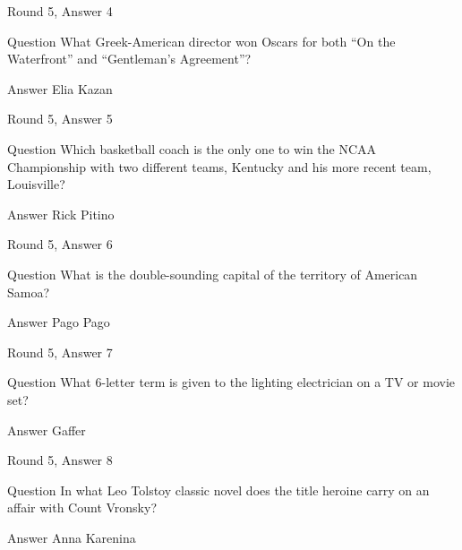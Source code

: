 \documentclass[11pt]{beamer}
\begin{document}
\begin{frame}[t]{Round 5, Answer 4}
\vspace{2em}
\begin{block}{Question}
What Greek-American director won Oscars for both ``On the Waterfront'' and ``Gentleman's Agreement''\@?
\end{block}
\pause{}
\begin{block}{Answer}
Elia Kazan
\end{block}
\end{frame}
    

\begin{frame}[t]{Round 5, Answer 5}
\vspace{2em}
\begin{block}{Question}
Which basketball coach is the only one to win the NCAA Championship with two different teams, Kentucky and his more recent team, Louisville\@?
\end{block}
\pause{}
\begin{block}{Answer}
Rick Pitino
\end{block}
\end{frame}
    

\begin{frame}[t]{Round 5, Answer 6}
\vspace{2em}
\begin{block}{Question}
What is the double-sounding capital of the territory of American Samoa\@?
\end{block}
\pause{}
\begin{block}{Answer}
Pago Pago
\end{block}
\end{frame}
    

\begin{frame}[t]{Round 5, Answer 7}
\vspace{2em}
\begin{block}{Question}
What 6-letter term is given to the lighting electrician on a TV or movie set\@?
\end{block}
\pause{}
\begin{block}{Answer}
Gaffer
\end{block}
\end{frame}
    

\begin{frame}[t]{Round 5, Answer 8}
\vspace{2em}
\begin{block}{Question}
In what Leo Tolstoy classic novel does the title heroine carry on an affair with Count Vronsky\@?
\end{block}
\pause{}
\begin{block}{Answer}
Anna Karenina
\end{block}
\end{frame}
    
\end{document}
